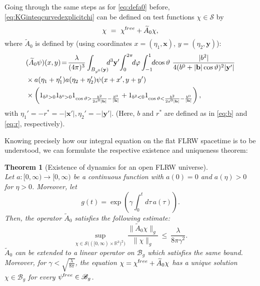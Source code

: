 \documentclass[b5paper,draft,openbib,12pt]{memoir}
\newtheorem{Thm}[Def]{Theorem}
\newcommand{\R}{\mathbb{R}}
\newcommand{\vx}{\mathbf{x}}
\newcommand{\vy}{\mathbf{y}}
\newcommand{\vb}{\mathbf{b}}
\newcommand{\free}{{\textup free}}
\newcommand{\Banach}{\mathscr{B}}
\begin{document}
Going through the same steps as for \eqref{eq:defa0} 
before, \eqref{eq:KGinteqcurvedexplicitchi} can be 
defined on test functions $\chi \in \mathcal{S}$ by
\begin{equation}
	\chi ~=~ \chi^\free + \widetilde{A}_0 \chi,
\label{eq:inteqcurvedabstract}
\end{equation}
where $\widetilde{A}_0$ is defined by (using 
coordinates $x=(\eta_1,\vx)$, $y=(\eta_2,\vy)$):
\begin{align}\nonumber
    &(\widetilde{A}_0\psi)(x,y)\!=\!\frac{\lambda}{(4\pi)^3}\int_{B_{y^0}(\vy)}\!\!\!d^3\vy'  \!\int_0^{2\pi}\!\!d\varphi \int_{-1}^{1} \!\!d\!\cos\vartheta ~\frac{|b^2|}{4(b^0+|\vb|\cos\vartheta)^2 |\vy'|}  \\
    &\times a(\eta_1+\eta_1') a(\eta_2+\eta_2') \psi(x+x',y+y')\notag\\ 
    &\times \left(1_{b^2>0}1_{b^0>0} 1_{\cos\vartheta > \frac{b^2}{2x^0|\vb|} - \frac{b^0}{|\vb|}}+1_{b^2<0}1_{\cos\vartheta<\frac{b^2}{2x^0|\vb|} - \frac{b^0}{|\vb|}}\right),
\label{eq:defa0tilde}
\end{align}
with \(\eta_1'=-r^*=-|\vx'| , \eta_2'=-|\vy'|\). 
(Here, $b$ and $r^*$ are defined as in \eqref{eq:b} 
and \eqref{eq:r}, respectively).

Knowing precisely how our integral equation on the 
flat FLRW spacetime is to be understood, we can 
formulate the respective existence and uniqueness 
theorem:

\begin{Thm}[Existence of dynamics for an open FLRW 
  universe]
	\label{thm:existencecurved}~\\
  Let $a: [0,\infty) \rightarrow [0,\infty)$ be a 
  continuous function with $a(0)=0$ and $a(\eta)>0$ 
  for $\eta>0$. Moreover, let
	\begin{equation}
		g(t) = \exp \left( \gamma \int_0^t d\tau \, a(\tau) \right).
	\end{equation}
  Then, the operator $\widetilde{A}_0$ satisfies the 
  following estimate:
	\begin{equation}
		\sup_{\chi \in \mathcal{S}\big( ([0,\infty)\times \R^3)^2\big)} \frac{\| \widetilde{A}_0 \chi \|_g}{\| \chi \|_g} ~\leq~ \frac{\lambda}{8\pi \gamma^2}.
	\label{eq:a0tildebound}
	\end{equation}
  $\widetilde{A}_0$ can be extended to a linear 
  operator on $\Banach_g$ which satisfies the same 
  bound. Moreover, for $\gamma < 
  \sqrt{\frac{\lambda}{8\pi}}$, the equation 
  $\chi = \chi^\free + \widetilde{A}_0\chi$ has a 
  unique solution $\chi \in \Banach_g$ for every 
  $\psi^\free \in \Banach_g$.
\end{Thm}
\end{document}
